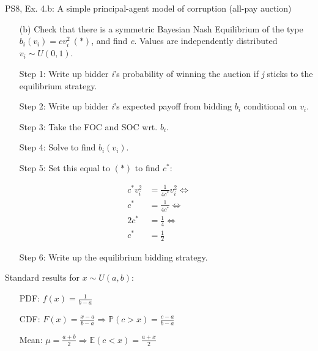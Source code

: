 \begin{frame}{PS8, Ex. 4.b: A simple principal-agent model of corruption (all-pay auction)}
    \begin{itemize}
      \item[(b)] Check that there is a symmetric Bayesian Nash Equilibrium of the type $b_i(v_i) = cv_i^2\ (*)$, and find \textit{c}. Values are independently distributed $v_i\sim U(0, 1)$.
    \end{itemize} \vspace{-8pt}
    \begin{multicols}{2}
      \begin{itemize}
        \item[Step 1:] Write up bidder \textit{i}'s probability of winning the auction if \textit{j} sticks to the equilibrium strategy.
        \item[Step 2:] Write up bidder \textit{i}'s expected payoff from bidding $b_i$ conditional on $v_i$.
        \item[Step 3:] Take the FOC and SOC wrt. $b_i$.
        \item[Step 4:] Solve to find $b_i(v_i)$.
        \item[Step 5:] Set this equal to $(*)$ to find $c^*$:
      \end{itemize} \vspace{-6pt}
      \begin{align*}
        c^*v_i^2&=\frac{1}{4c^*}v_i^2\Leftrightarrow\\
        c^*&=\frac{1}{4c^*}\Leftrightarrow\\
        2c^*&=\frac{1}{4}\Leftrightarrow\\
        c^*&=\frac{1}{2}
      \end{align*} \vspace{-12pt}
      \begin{itemize}
        \item[Step 6:] Write up the equilibrium bidding strategy.
      \end{itemize}
      \vfill\null\columnbreak
      Standard results for $x\sim U(a, b):$ \vspace{-6pt}
      \begin{itemize}
        \item[PDF:] $f(x)=\frac{1}{b-a}$
        \item[CDF:] $F(x)=\frac{x-a}{b-a}\Rightarrow\mathbb{P}(c>x)=\frac{c-a}{b-a}$
        \item[Mean:] $\mu=\frac{a+b}{2}\Rightarrow\mathbb{E}(c<x)=\frac{a+x}{2}$
      \end{itemize}

\end{multicols}
\end{frame}
